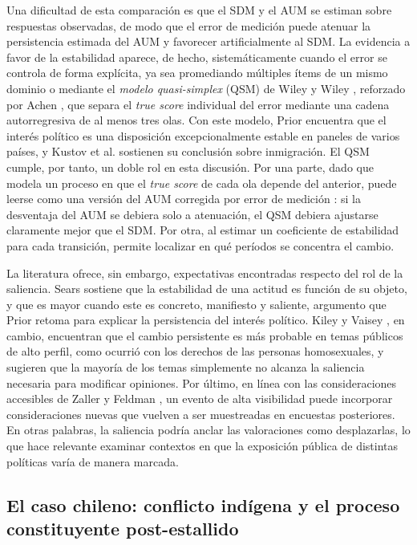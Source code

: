 \documentclass{article}
\begin{document}
Una dificultad de esta comparación es que el SDM y el AUM se estiman sobre respuestas observadas, de modo que el error de medición puede atenuar la persistencia estimada del AUM y favorecer artificialmente al SDM. La evidencia a favor de la estabilidad aparece, de hecho, sistemáticamente cuando el error se controla de forma explícita, ya sea promediando múltiples ítems de un mismo dominio \parencite{ansolabehere2008} o mediante el \textit{modelo quasi-simplex} (QSM) de Wiley y Wiley \parencite*{wiley1970}, reforzado por Achen \parencite*{achen1975}, que separa el \textit{true score} individual del error mediante una cadena autorregresiva de al menos tres olas. Con este modelo, Prior \parencite*{prior2010} encuentra que el interés político es una disposición excepcionalmente estable en paneles de varios países, y Kustov et al. \parencite*{kustov2021} sostienen su conclusión sobre inmigración. El QSM cumple, por tanto, un doble rol en esta discusión. Por una parte, dado que modela un proceso en que el \textit{true score} de cada ola depende del anterior, puede leerse como una versión del AUM corregida por error de medición \parencite{kiley2020}: si la desventaja del AUM se debiera solo a atenuación, el QSM debiera ajustarse claramente mejor que el SDM. Por otra, al estimar un coeficiente de estabilidad para cada transición, permite localizar en qué períodos se concentra el cambio.

La literatura ofrece, sin embargo, expectativas encontradas respecto del rol de la saliencia. Sears \parencite*{sears1983} sostiene que la estabilidad de una actitud es función de su objeto, y que es mayor cuando este es concreto, manifiesto y saliente, argumento que Prior \parencite*{prior2010} retoma para explicar la persistencia del interés político. Kiley y Vaisey \parencite*{kiley2020}, en cambio, encuentran que el cambio persistente es más probable en temas públicos de alto perfil, como ocurrió con los derechos de las personas homosexuales, y sugieren que la mayoría de los temas simplemente no alcanza la saliencia necesaria para modificar opiniones. Por último, en línea con las consideraciones accesibles de Zaller y Feldman \parencite*{zaller1992}, un evento de alta visibilidad puede incorporar consideraciones nuevas que vuelven a ser muestreadas en encuestas posteriores. En otras palabras, la saliencia podría anclar las valoraciones como desplazarlas, lo que hace relevante examinar contextos en que la exposición pública de distintas políticas varía de manera marcada.


\subsection{El caso chileno: conflicto indígena y el proceso constituyente post-estallido}
\end{document}
